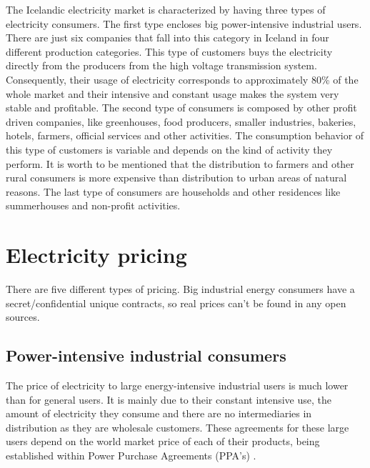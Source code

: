 \documentclass[svn, final]{rureport}
\begin{document}
The Icelandic electricity market is characterized by having three types of electricity consumers. The first type encloses big power-intensive industrial users.  There are just six companies that fall into this category in Iceland in four different production categories. This type of customers buys the electricity directly from the producers from the high voltage transmission system. Consequently, their usage of electricity corresponds to approximately 80\% of the whole market and their intensive and constant usage makes the system very stable and profitable. The second type of consumers is composed by other profit driven companies, like greenhouses, food producers, smaller industries, bakeries, hotels, farmers, official services and other activities. The consumption behavior of this type of customers is variable and depends on the kind of activity they perform. It is worth to be mentioned that the distribution to farmers and other rural consumers is more expensive than distribution to urban areas of natural reasons. The last type of consumers are households and other residences like summerhouses and non-profit activities. 


\section{Electricity pricing}

There are five different types of pricing. Big industrial energy consumers have a secret/confidential unique contracts, so real prices can’t be found in any open sources.

\subsection{Power-intensive industrial consumers}

The price of electricity to large energy-intensive industrial users is much lower than for general users. It is mainly due to their constant intensive use, the amount of electricity they consume and there are no intermediaries in distribution as they are wholesale customers. These agreements for these large users depend on the world market price of each of their products, being established within Power Purchase Agreements (PPA's) \cite{our_energy_2016}.
\end{document}
